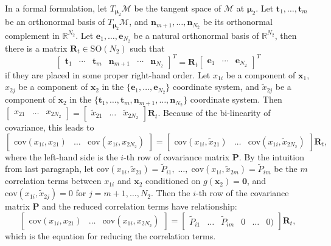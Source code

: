 \documentclass[12pt]{article}
\begin{document}
In a formal formulation, let $T_{\bm{\mu}_2}\mathcal{M}$ be the tangent space of $\mathcal{M}$ at $\bm{\mu}_2$.
Let $\bm{t}_1,\ldots,\bm{t}_m$ be an orthonormal basis of $T_{\bm{\mu}_2}\mathcal{M}$, and $\bm{n}_{m+1},\ldots,\bm{n}_{N_2}$ be its orthonormal complement in $\mathbb{R}^{N_2}$.
Let $\bm{e}_1,\ldots,\bm{e}_{N_2}$ be a natural orthonormal basis of $\mathbb{R}^{N_2}$, then there is a matrix $\mathbf{R}_t\in\mathrm{SO}(N_2)$ such that 
\begin{equation} \label{eqn:changeOfBasis}
\left[\begin{matrix}\bm{t}_1 & \cdots & \bm{t}_m & \bm{n}_{m+1} & \cdots & \bm{n}_{N_2} \end{matrix}\right]^T = \mathbf{R}_t \left[\begin{matrix}\bm{e}_1 & \cdots & \bm{e}_{N_2}\end{matrix}\right]^T
\end{equation}
if they are placed in some proper right-hand order.
Let $x_{1i}$ be a component of $\bm{x}_1$, $x_{2j}$ be a component of $\bm{x}_2$ in the $\{\bm{e}_1,\ldots,\bm{e}_{N_2}\}$ coordinate system, and $\tilde{x}_{2j}$ be a component of $\bm{x}_2$ in the $\{\bm{t}_1,\ldots,\bm{t}_m,\bm{n}_{m+1},\ldots,\bm{n}_{N_2}\}$ coordinate system.
Then $[\begin{matrix}x_{21} & \ldots & x_{2N_2}\end{matrix}] = [\begin{matrix}\tilde{x}_{21} & \ldots & \tilde{x}_{2N_2}\end{matrix}]\mathbf{R}_t$.
Because of the bi-linearity of covariance, this leads to
\begin{equation}
	\left[\begin{matrix}
	\text{cov}(x_{1i},x_{21}) & \ldots & \text{cov}(x_{1i},x_{2N_2})
	\end{matrix}\right] = \left[\begin{matrix}
	\text{cov}(x_{1i},\tilde{x}_{21}) & \ldots & \text{cov}(x_{1i},\tilde{x}_{2N_2})
	\end{matrix}\right]\mathbf{R}_t,
\end{equation}
where the left-hand side is the $i$-th row of covariance matrix $\mathbf{P}$.
By the intuition from last paragraph, let $\mathrm{cov}(x_{1i},\tilde{x}_{21})=\tilde{P}_{i1}, \; \ldots, \; \mathrm{cov}(x_{1i},\tilde{x}_{2m})=\tilde{P}_{im}$ be the $m$ correlation terms between $x_{1i}$ and $\bm{x}_2$ conditioned on $g(\bm{x}_2)=\bm{0}$, and $\mathrm{cov}(x_{1i},\tilde{x}_{2j}) = 0$ for $j=m+1,\ldots,N_2$.
Then the $i$-th row of the covariance matrix $\mathbf{P}$ and the reduced correlation terms have relationship:
\begin{equation} \label{eqn:reduceCorrelation}
	\left[\begin{matrix}
	\text{cov}(x_{1i},x_{21}) & \ldots & \text{cov}(x_{1i},x_{2N_2})
	\end{matrix}\right] = \left[\begin{matrix}
	\tilde{P}_{i1} & \ldots & \tilde{P}_{im} & 0 & \ldots & 0)
	\end{matrix}\right]\mathbf{R}_t,
\end{equation}
which is the equation for reducing the correlation terms.
\end{document}
